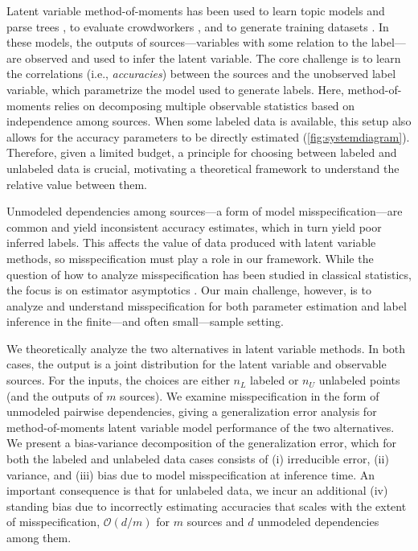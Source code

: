 Latent variable method-of-moments has been used to learn topic models \citep{anandkumar2014tensor} and parse trees \citep{Hsu12}, to evaluate crowdworkers \citep{joglekar2013evaluating}, and to generate training datasets \citep{Ratner19, fu2020fast}.
In these models, the outputs of sources---variables with some relation to the label---are observed and used to infer the latent variable. The core challenge is to learn the correlations (i.e., \emph{accuracies}) between the sources and the unobserved label variable, which parametrize the model used to generate labels.
Here, method-of-moments relies on decomposing multiple observable statistics based on independence among sources. When some labeled data is available, this setup also allows for the accuracy parameters to be directly estimated (\autoref{fig:systemdiagram}).
Therefore, given a limited budget, a principle for choosing between labeled and unlabeled data is crucial, motivating a theoretical framework to understand the relative value between them.

Unmodeled dependencies among sources---a form of model misspecification---are common and yield inconsistent accuracy estimates, which in turn yield poor inferred labels. This affects the value of data produced with latent variable methods, so misspecification must play a role in our framework. While the question of how to analyze misspecification has been studied in classical statistics, the focus is on estimator asymptotics \citep{kleijn2006, kleijn2012}. Our main challenge, however, is to analyze and understand misspecification for both parameter estimation and label inference in the finite---and often small---sample setting.


We theoretically analyze the two alternatives in latent variable methods. In both cases, the output is a joint distribution for the latent variable and observable sources. For the inputs, the choices are either $n_L$ labeled or $n_U$ unlabeled points (and the outputs of $m$ sources). We examine misspecification in the form of unmodeled pairwise dependencies, giving a generalization error analysis for method-of-moments latent variable model performance of the two alternatives. We present a bias-variance decomposition of the generalization error, which for both the labeled and unlabeled data cases consists of (i) irreducible error, (ii) variance, and (iii) bias due to model misspecification at inference time. An important consequence is that for unlabeled data, we incur an additional (iv) standing bias due to incorrectly estimating accuracies that scales with the extent of misspecification, $\mathcal{O}(d/m)$ for $m$ sources and $d$ unmodeled dependencies among them. 

